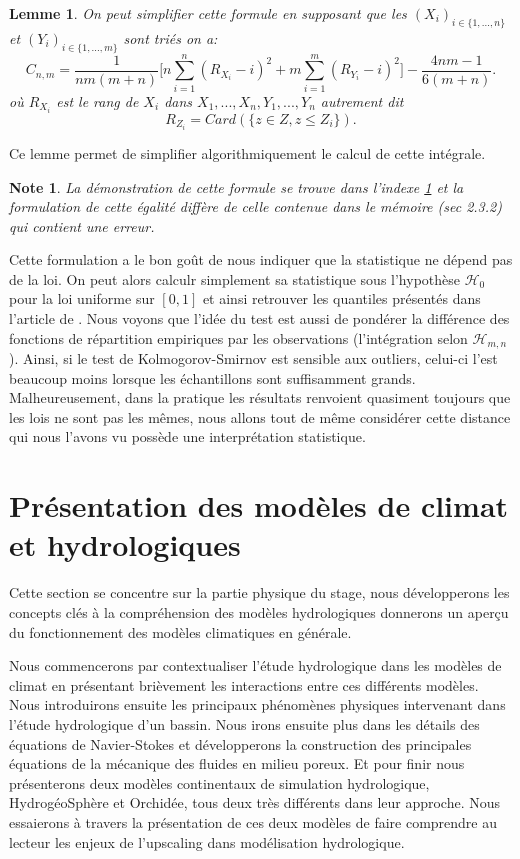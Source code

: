\documentclass[a4paper,11pt]{article}
\numberwithin{equation}{section}
\newtheorem{lemma}{Lemme}
\newtheorem{note}{Note}
\begin{document}
\begin{lemma}
	\label{C-v}
	On peut simplifier cette formule en supposant que les $(X_i)_{i\in \{1,...,n\}}$ et $(Y_i)_{i\in \{1,...,m\}}$ sont triés on a:
	\begin{equation}
		C_{n,m}=\frac{1}{nm(m+n)}\Big[ n\sum_{i=1}^{n}(R_{X_i}-i)^2+ m\sum_{i=1}^{m}(R_{Y_i}-i)^2\Big]-\frac{4nm-1}{6(m+n)}.
	\end{equation}
	où $R_{X_i}$ est le rang de $X_i$ dans $X_1,...,X_n,Y_1,...,Y_n$ autrement dit 
	\[R_{Z_i}=Card(\{z\in Z, z\leq Z_i\}).\] 
\end{lemma}
Ce lemme permet de simplifier algorithmiquement le calcul de cette intégrale.
\begin{note}
	La démonstration de cette formule se trouve dans l'indexe \ref{C-v} et la formulation de cette égalité diffère de celle contenue dans le mémoire \cite{ethier2011propos}(sec 2.3.2) qui contient une erreur.
\end{note}
Cette formulation a le bon goût de nous indiquer que la statistique ne dépend pas de la loi. On peut alors calculr simplement sa statistique sous l'hypothèse $\mathcal{H}_0$ pour la loi uniforme sur $[0,1]$ et ainsi retrouver les quantiles présentés dans l'article de \cite{buning2002robustness}. Nous voyons que l'idée du test est aussi de pondérer la différence des fonctions de répartition empiriques par les observations (l'intégration selon $\mathcal{H}_{m,n}$). Ainsi, si le test de Kolmogorov-Smirnov est sensible aux outliers, celui-ci l’est beaucoup moins lorsque les échantillons sont suffisamment grands. Malheureusement, dans la pratique les résultats renvoient quasiment toujours que les lois ne sont pas les mêmes, nous allons tout de même considérer cette distance qui nous l'avons vu possède une interprétation statistique.  

\newpage
\section{Présentation des modèles de climat et hydrologiques}
\label{ch:presentation modele climat}

Cette section se concentre sur la partie physique du stage, nous développerons les concepts clés à la compréhension des modèles hydrologiques donnerons un aperçu du fonctionnement des modèles climatiques en générale. 

\vspace{0.7cm}

Nous commencerons par contextualiser l'étude hydrologique dans les modèles de climat en présentant brièvement les interactions entre ces différents modèles. Nous introduirons ensuite les principaux phénomènes physiques intervenant dans l'étude hydrologique d'un bassin. Nous irons ensuite plus dans les détails des équations de Navier-Stokes et développerons la construction des principales équations de la mécanique des fluides en milieu poreux. Et pour finir nous présenterons deux modèles continentaux de simulation hydrologique, HydrogéoSphère et Orchidée, tous deux très différents dans leur approche. Nous essaierons à travers la présentation de ces deux modèles de faire comprendre au lecteur les enjeux de l'upscaling dans modélisation hydrologique.
\end{document}
